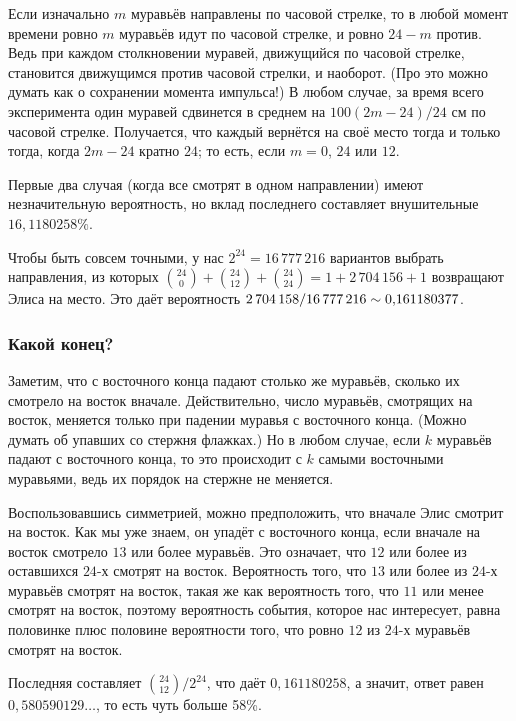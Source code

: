 Если изначально $m$ муравьёв направлены по часовой стрелке, то в любой момент времени ровно $m$ муравьёв идут по часовой стрелке, и ровно $24 - m$ против.
Ведь при каждом столкновении муравей, движущийся по часовой стрелке, становится движущимся против часовой стрелки, и наоборот.
(Про это можно думать как о сохранении момента импульса!)
В любом случае, за время всего эксперимента один муравей сдвинется в среднем на $100(2m - 24)/24$ см по часовой стрелке.
Получается, что каждый вернётся на своё место тогда и только тогда, когда $2m - 24$ кратно $24$; то есть, если $m = 0$, $24$ или $12$.

Первые два случая (когда все смотрят в одном направлении) имеют незначительную вероятность, но вклад последнего составляет внушительные $16{,}1180258\%$. %

Чтобы быть совсем точными, у нас $2^{24}=16\,777\,216$ вариантов выбрать направления, из которых  $\binom{24}0+\binom{24}{12}+\binom{24}{24}=1+2\,704\,156+1$ возвращают Элиса на место.
Это даёт вероятность $2\,704\,158/16\,777\,216 \z\sim 0{,}161180377$.

\subsubsection*{Какой конец?}

Заметим, что с восточного конца падают столько же муравьёв, сколько их смотрело на восток вначале.
Действительно, число муравьёв, смотрящих на восток, меняется только при падении муравья с восточного конца.
(Можно думать об упавших со стержня флажках.)
Но в любом случае, если $k$ муравьёв падают с восточного конца, то это происходит с $k$ самыми восточными муравьями, ведь их порядок на стержне не меняется.

Воспользовавшись симметрией, можно предположить, что вначале Элис смотрит на восток.
Как мы уже знаем, он упадёт с восточного конца, если вначале на восток смотрело $13$ или более муравьёв.
Это означает, что $12$ или более из оставшихся $24$-х смотрят на восток.
Вероятность того, что $13$ или более из $24$-х муравьёв смотрят на восток, такая же как вероятность того, что $11$ или менее смотрят на восток, поэтому вероятность события, которое нас интересует, равна половинке плюс половине вероятности того, что ровно $12$ из $24$-х муравьёв смотрят на восток.

Последняя составляет $\binom{24}{12}/2^{24}$, что даёт $0{,}161180258$, а значит, ответ равен $0{,}580590129\dots$, то есть чуть больше  58\%.


